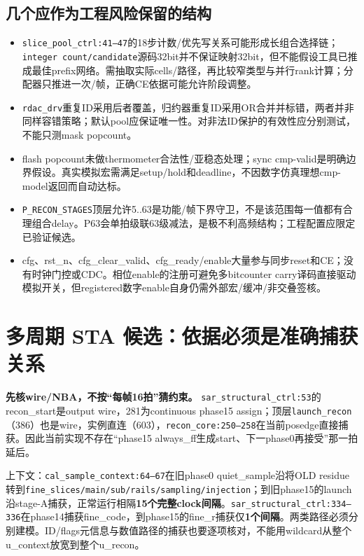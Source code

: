 \documentclass[UTF8,fontset=fandol,10pt,a4paper,openany]{ctexrep}
\newcommand{\code}[1]{\nolinkurl{#1}}
\begin{document}
\subsection{几个应作为工程风险保留的结构}


\begin{itemize}
\item \code{slice_pool_ctrl:41–47}的18步计数/优先写关系可能形成长组合选择链；\code{integer count/candidate}源码32bit并不保证映射32bit，但不能假设工具已推成最佳prefix网络。需抽取实际cells/路径，再比较窄类型与并行rank计算；分配器只推进一次/帧，正确CE依据可能允许阶段调整。
\item \code{rdac_drv}重复ID采用后者覆盖，归约器重复ID采用OR合并并标错，两者并非同样容错策略；默认pool应保证唯一性。对非法ID保护的有效性应分别测试，不能只测mask popcount。
\item flash popcount未做thermometer合法性/亚稳态处理；sync cmp-valid是明确边界假设。真实模拟宏需满足setup/hold和deadline，不因数字仿真理想cmp-model返回而自动达标。
\item \code{P_RECON_STAGES}顶层允许5..63是功能/帧下界守卫，不是该范围每一值都有合理组合delay。P63会单拍级联63级减法，是极不利高频结构；工程配置应限定已验证候选。
\item cfg、rst\_n、cfg\_clear\_valid、cfg\_ready/enable大量参与同步reset和CE；没有时钟门控或CDC。相位enable的注册可避免多bitcounter carry译码直接驱动模拟开关，但registered数字enable自身仍需外部宏/缓冲/非交叠签核。
\end{itemize}


\section{多周期 STA 候选：依据必须是准确捕获关系}


\textbf{先核wire/NBA，不按“每帧16拍”猜约束。} \code{sar_structural_ctrl:53}的recon\_start是output wire，281为continuous phase15 assign；顶层\code{launch_recon}（386）也是wire，实例直连（603），\code{recon_core:250–258}在当前posedge直接捕获。因此当前实现不存在“phase15 always\_ff生成start、下一phase0再接受”那一拍延后。


上下文：\code{cal_sample_context:64–67}在旧phase0 quiet\_sample沿将OLD residue转到\code{fine_slices/main/sub/rails/sampling/injection}；到旧phase15的launch沿stage-A捕获，正常运行相隔\textbf{15个完整clock间隔}。\code{sar_structural_ctrl:334–336}在phase14捕获fine\_code，到phase15的fine\_r捕获仅\textbf{1个间隔}。两类路径必须分别建模。ID/flags元信息与数值路径的捕获也要逐项核对，不能用wildcard从整个u\_context放宽到整个u\_recon。
\end{document}
